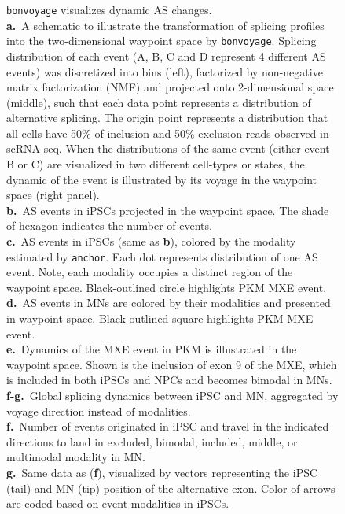\clearpage
\thispagestyle{facingcaption}
\begin{figure}[h]
\captionsetup{labelformat=prev-page}
\caption[\texttt{bonvoyage} visualizes dynamic AS changes.]{\texttt{bonvoyage} visualizes dynamic AS changes.\\
\textbf{a.}~A schematic to illustrate the transformation of splicing profiles into the two-dimensional waypoint space by \texttt{bonvoyage}. Splicing distribution of each event (A, B, C and D represent 4 different AS events) was discretized into bins (left), factorized by non-negative matrix factorization (NMF) and projected onto 2-dimensional space (middle), such that each data point represents a distribution of alternative splicing. The origin point represents a distribution that all cells have 50\% of inclusion and 50\% exclusion reads observed in scRNA-seq. When the distributions of the same event (either event B or C) are visualized in two different cell-types or states, the dynamic of the event is illustrated by its voyage in the waypoint space (right panel).\\
\textbf{b.}~AS events in iPSCs projected in the waypoint space. The shade of hexagon indicates the number of events. \\
\textbf{c.}~AS events in iPSCs (same as \textbf{b}), colored by the modality estimated by \texttt{anchor}. Each dot represents distribution of one AS event. Note, each modality occupies a distinct region of the waypoint space. Black-outlined circle highlights PKM MXE event.\\
\textbf{d.}~AS events in MNs are colored by their modalities and presented in waypoint space. Black-outlined square highlights PKM MXE event.\\
\textbf{e.}~Dynamics of the MXE event in PKM is illustrated in the waypoint space. Shown is the inclusion of exon 9 of the MXE, which is included in both iPSCs and NPCs and becomes bimodal in MNs.\\
\textbf{f-g.}~Global splicing dynamics between iPSC and MN, aggregated by voyage direction instead of modalities. \\
\textbf{f.}~Number of events originated in iPSC and travel in the indicated directions to land in excluded, bimodal, included, middle, or multimodal modality in MN. \\
\textbf{g.}~Same data as (\textbf{f}), visualized by vectors representing the iPSC (tail) and MN (tip) position of the alternative exon. Color of arrows are coded based on event modalities in iPSCs.
}
\label{fig:bonvoyage_overview}
\end{figure}
